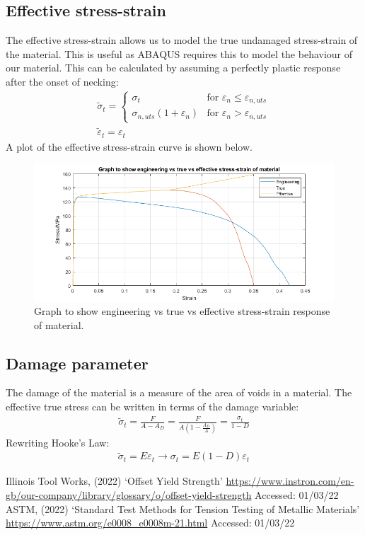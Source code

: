 \documentclass[11pt]{article}
\numberwithin{equation}{section}
\begin{document}
\subsection{Effective stress-strain}
The effective stress-strain allows us to model the true undamaged stress-strain of the material. This is useful as ABAQUS requires this to model the behaviour of our material. This can be calculated by assuming a perfectly plastic response after the onset of necking:
\begin{gather}
    \widetilde{\sigma}_t = \begin{cases}
        \sigma_t & \textrm{for } \varepsilon_n \leq \varepsilon_{n,uts}\\
        \sigma_{n,uts}\left(1 + \varepsilon_n\right) & \textrm{for } \varepsilon_n > \varepsilon_{n,uts}
    \end{cases}\\
    \widetilde{\varepsilon}_t = \varepsilon_t
\end{gather}
A plot of the effective stress-strain curve is shown below.
\begin{figure}[H]
    \centering
    \includegraphics[width = \textwidth]{./img/engVsTrueVsEffectiveStressStrain.png}
    \caption{Graph to show engineering vs true vs effective stress-strain response of material.}
    \label{engVsTrueVsEffectiveStressStrainCurve}
\end{figure}
\subsection{Damage parameter}
The damage of the material is a measure of the area of voids in a material. The effective true stress can be written in terms of the damage variable:
\begin{align}
    \widetilde{\sigma}_t = \frac{F}{A-A_D} = \frac{F}{A\left(1 - \frac{A_D}{A}\right)} = \frac{\sigma_t}{1 - D}
\end{align}
Rewriting Hooke's Law:
\begin{gather}
    \widetilde{\sigma}_t = E \varepsilon_t \rightarrow \sigma_t = E\left(1-D\right)\varepsilon_t
\end{gather}
\newpage
\begin{thebibliography}{00}
     Illinois Tool Works, (2022) `Offset Yield Strength' \url{https://www.instron.com/en-gb/our-company/library/glossary/o/offset-yield-strength} Accessed: 01/03/22
     ASTM, (2022) `Standard Test Methods for Tension Testing of Metallic Materials' \url{https://www.astm.org/e0008_e0008m-21.html} Accessed: 01/03/22
\end{thebibliography}
\end{document}
